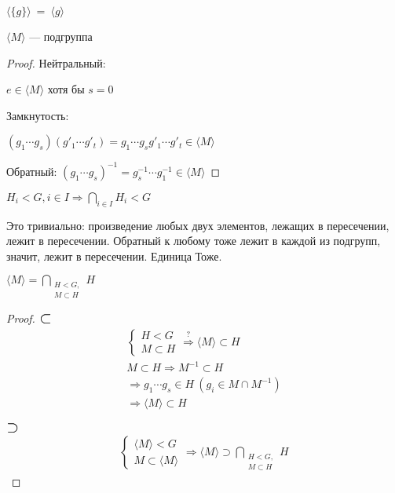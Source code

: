 \notice $\langle \{g\} \rangle \ =\ \langle g \rangle$
\begin{theorem-non}
  $\langle M \rangle$ --- подгруппа
  \begin{proof}
    Нейтральный:

    $e\in \langle M \rangle$ хотя бы $s = 0$

    Замкнутость: 

    $(g_1 \cdots g_s)(g'_1 \cdots g'_t) = g_1 \cdots g_s g'_1 \cdots g'_t \in \langle M \rangle$

    Обратный:
    $(g_1 \cdots g_s)^{-1} = g_s^{-1} \cdots g_1^{-1} \in \langle M \rangle$  
  \end{proof}
  
\end{theorem-non}
\notice $H_i < G, i\in I \Longrightarrow \bigcap\limits_{i\in I} H_i < G$

Это тривиально: произведение любых двух элементов, лежащих в пересечении, лежит в пересечении. Обратный к любому тоже лежит в каждой из подгрупп, значит, лежит в пересечении. Единица Тоже.

\begin{theorem-non}
  $\langle M \rangle = \bigcap\limits_{\substack{H < G, \\ M \subset H}} H $

\begin{proof}
  $\mbox{\Large$\subset$}$
  \begin{gather*}
    \begin{cases}
      H < G \\
      M \subset H
    \end{cases}
    \stackrel{?}{\Longrightarrow} \langle M \rangle \subset H \\
    M \subset H \Longrightarrow M^{-1} \subset H \\
    \Longrightarrow g_1 \cdots g_s \in H\ (g_i\in M \cap M^{-1}) \\
    \Longrightarrow \langle M \rangle \subset H
  \end{gather*}

  $\mbox{\Large$\supset$}$
  \begin{gather*}
    \begin{cases}
      \langle M \rangle < G \\
      M \subset \langle M \rangle
    \end{cases}
    \Longrightarrow \langle M \rangle \supset \bigcap\limits_{\substack{H < G, \\ M \subset H}} H
  \end{gather*}
  
\end{proof}
\end{theorem-non}

